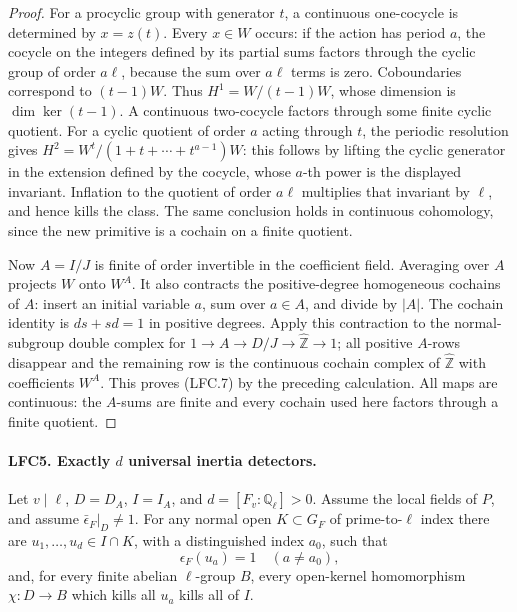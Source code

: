 \begin{proof}
For a procyclic group with generator \(t\), a continuous
one-cocycle is determined by \(x=z(t)\).
Every \(x\in W\) occurs: if the action has period \(a\),
the cocycle on the integers defined by its partial sums
factors through the cyclic group of order \(a\ell\), because
the sum over \(a\ell\) terms is zero.
Coboundaries correspond to \((t-1)W\).  Thus
\(H^1=W/(t-1)W\), whose dimension is \(\dim\ker(t-1)\).
A continuous two-cocycle factors through some finite cyclic
quotient.  For a cyclic quotient of order \(a\) acting through
\(t\), the periodic resolution gives
\(H^2=W^t/(1+t+\cdots+t^{a-1})W\): this follows by lifting
the cyclic generator in the extension defined by the cocycle,
whose \(a\)-th power is the displayed invariant.
Inflation to the quotient of order \(a\ell\) multiplies that
invariant by \(\ell\), and hence kills the class.
The same conclusion holds in continuous cohomology, since
the new primitive is a cochain on a finite quotient.

Now \(A=I/J\) is finite of order invertible in the coefficient
field.  Averaging over \(A\) projects \(W\) onto \(W^A\).
It also contracts the positive-degree homogeneous cochains
of \(A\): insert an initial variable \(a\), sum over \(a\in A\),
and divide by \(|A|\).  The cochain identity is \(ds+sd=1\)
in positive degrees.  Apply this contraction to the
normal-subgroup double complex for
\(1\to A\to D/J\to\widehat{\mathbb Z}\to1\);
all positive \(A\)-rows disappear and the remaining row is
the continuous cochain complex of
\(\widehat{\mathbb Z}\) with coefficients \(W^A\).
This proves (LFC.7) by the preceding calculation.
All maps are continuous: the \(A\)-sums are finite and every
cochain used here factors through a finite quotient.
\end{proof}

\paragraph{LFC5. Exactly \(d\) universal inertia detectors.}
\label{claim:LFC5}
Let \(v\mid\ell\), \(D=D_A\), \(I=I_A\), and
\(d=[F_v:\mathbb Q_\ell]>0\).  Assume the local fields of
\(P\), and assume \(\bar\epsilon_F|_D\ne1\).
For any normal open \(K\subset G_F\) of prime-to-\(\ell\)
index there are \(u_1,\ldots,u_d\in I\cap K\), with a
distinguished index \(a_0\), such that
\[
 \epsilon_F(u_a)=1\quad(a\ne a_0),                       \tag{LFC.8}
\]
and, for every finite abelian \(\ell\)-group \(B\), every
open-kernel homomorphism \(\chi:D\to B\) which kills all
\(u_a\) kills all of \(I\).

